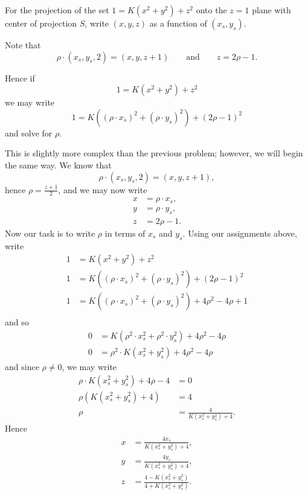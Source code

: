 \documentclass{ximera}
\begin{document}
\begin{problem}
  For the projection of the set $1=K\left(x^{2}+y^{2}\right)+z^{2}$
  onto the $z=1$ plane with center of projection $S$, write
  $(x,y,z)$ as a function of $(x_s,y_s)$.
  \begin{hint}
    Note that
      \[
      \rho\cdot(x_{s},y_{s},2)=(x,y,z+1) \qquad\text{and}\qquad z = 2\rho-1.
      \]
  \end{hint}
  \begin{hint}
    Hence if
    \[
    1 = K\left(x^2 + y^2\right) + z^2
    \]
    we may write
    \[
    1 = K\left((\rho\cdot x_s)^2 + (\rho\cdot y_s)^2\right) + (2\rho-1)^2
    \]
    and solve for $\rho$.
  \end{hint}
  \begin{freeResponse}
    This is slightly more complex than the previous problem; however,
    we will begin the same way. We know that
    \[
    \rho\cdot(x_{s},y_{s},2)=(x,y,z+1),
    \]
    hence $\rho=\frac{z+1}{2}$, and we may now write
    \begin{align*}
      x &= \rho \cdot x_s,\\
      y &= \rho \cdot y_s,\\
      z &= 2\rho-1.
    \end{align*}
    Now our task is to write $\rho$ in terms of $x_s$ and
    $y_s$. Using our assignments above, write
    \begin{align*}
      1 &= K\left(x^2 + y^2\right) + z^2\\
      1 &= K\left((\rho\cdot x_s)^2 + (\rho\cdot y_s)^2\right) + (2\rho-1)^2\\
      1 &= K\left((\rho\cdot x_s)^2 + (\rho\cdot y_s)^2\right) + 4\rho^2-4\rho + 1\\
    \end{align*}
    and so
    \begin{align*}
      0 &= K\left(\rho^2\cdot x_s^2 + \rho^2\cdot y_s^2\right) + 4\rho^2-4\rho\\
      0 &= \rho^2\cdot K\left(x_s^2 + y_s^2\right) + 4\rho^2-4\rho
    \end{align*}
    and since $\rho \ne 0$, we may write
    \begin{align*}
      \rho\cdot K\left(x_s^2 + y_s^2\right) + 4\rho-4 &=0 \\
      \rho\left(K\left(x_s^2 + y_s^2\right) + 4\right) &=4\\
      \rho &= \frac{4}{K\left(x_s^2 + y_s^2\right) + 4}.
    \end{align*}
    Hence
    \begin{align*}
      x &= \frac{4x_s}{K\left(x_s^2 + y_s^2\right) + 4},\\
      y &= \frac{4y_s}{K\left(x_s^2 + y_s^2\right) + 4},\\
      z &= \frac{4-K\left(x_s^2 + y_s^2\right)}{4+K\left(x_s^2 + y_s^2\right)}.\\
    \end{align*}
  \end{freeResponse}
\end{problem}
\end{document}
